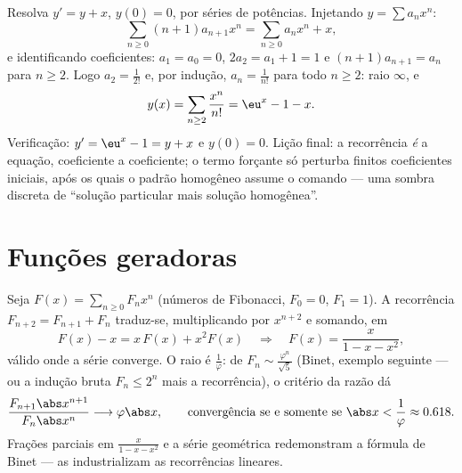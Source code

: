 \begin{example}\label{ex:b2:powerseries:odeforced}
Resolva $y' = y + x$, $y(0) = 0$, por séries de potências. Injetando $y =
\sum a_nx^n$:
\[
\sum_{n\geq0}(n+1)a_{n+1}x^n
= \sum_{n\geq0}a_nx^n + x ,
\]
e identificando coeficientes: $a_1 = a_0 = 0$, $2a_2 = a_1 + 1
= 1$ e $(n+1)a_{n+1} = a_n$ para $n \geq 2$. Logo $a_2 =
\frac{1}{2!}$ e, por indução, $a_n = \frac{1}{n!}$ para todo
$n \geq 2$: raio $\infty$, e
\[
y(x) = \sum_{n\geq2}\frac{x^n}{n!} = \eu^x - 1 - x .
\]
Verificação: $y' = \eu^x - 1 = y + x$ e $y(0) = 0$. Lição
final: a recorrência \emph{é} a equação, coeficiente a
coeficiente; o termo forçante só perturba finitos coeficientes
iniciais, após os quais o padrão homogêneo assume o comando
--- uma sombra discreta de ``solução particular mais
solução homogênea''.
\end{example}

\section{Funções geradoras}

\begin{example}[Fibonacci]\label{ex:b2:powerseries:fibonacci}
Seja $F(x) = \sum_{n\geq0} F_n x^n$ (números de Fibonacci, $F_0 = 0$,
$F_1 = 1$). A recorrência $F_{n+2} = F_{n+1} + F_n$ traduz-se,
multiplicando por $x^{n+2}$ e somando, em
\[
F(x) - x = x\,F(x) + x^2 F(x)
\quad\Longrightarrow\quad
F(x) = \frac{x}{1 - x - x^2} ,
\]
válido onde a série converge. O raio é
$\frac{1}{\varphi}$: de $F_n \sim
\frac{\varphi^n}{\sqrt5}$ (Binet, exemplo seguinte --- ou a indução
bruta $F_n \leq 2^n$ mais a recorrência), o critério da razão
dá
\[
\frac{F_{n+1}\abs x^{n+1}}{F_n\abs x^n}
\longrightarrow \varphi\abs x ,
\qquad\text{convergência se e somente se } \abs x < \frac1\varphi
\approx 0.618 .
\] Frações parciais em
$\frac{x}{1 - x - x^2}$ e a série geométrica redemonstram a fórmula
de Binet --- as  industrializam as recorrências
lineares.
\end{example}

